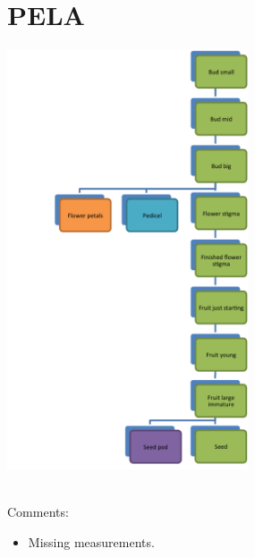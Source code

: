 \documentclass[10pt]{book} %
\begin{document}
\section{PELA}
\begin{multicols}{2}
\includegraphics[width=2.8in]{PELA.png}
\vfill
\columnbreak

\\Comments:
\begin{itemize}
\item Missing measurements.
\end{itemize}

\end{multicols}



\clearpage
\newpage
\end{document}
